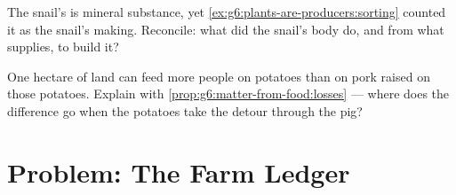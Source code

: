 \begin{exercise}[$\star\star$]\label{exo:g6:matter-from-food:11}
The snail's  is mineral substance, yet
\cref{ex:g6:plants-are-producers:sorting} counted it as the
snail's making. Reconcile: what did the snail's body do,
and from what supplies, to build it?
\end{exercise}

\begin{exercise}[$\star\star\star$]\label{exo:g6:matter-from-food:12}
One hectare of land can feed more people on potatoes than
on pork raised on those potatoes. Explain with
\cref{prop:g6:matter-from-food:losses} --- where does the
difference go when the potatoes take the detour through
the pig?
\end{exercise}

\section{Problem: The Farm Ledger}

